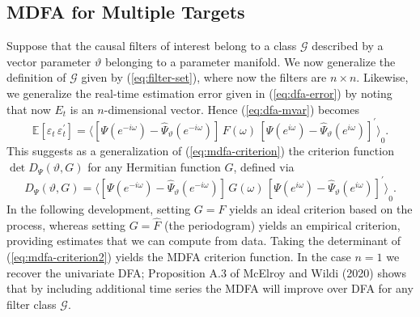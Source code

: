 \documentclass[a4paper]{book}
\def\EE{\mathbb E}
\begin{document}
 
\subsection{MDFA for Multiple Targets}

Suppose that the causal filters of interest belong to a class
  $\mathcal{G}$  described by a vector parameter $\vartheta$ belonging to a 
 parameter manifold.  We now generalize the definition of $\mathcal{G}$ given
  by (\ref{eq:filter-set}),  where now the filters are $n \times n$.
  Likewise, we generalize the real-time estimation error   given in (\ref{eq:dfa-error})
 by noting that now $E_t$ is an $n$-dimensional vector.  
  Hence (\ref{eq:dfa-mvar}) becomes
\begin{equation}
 \label{eq:dfa-mvar2}
   \EE [ \varepsilon_t \, \varepsilon_t^{\prime} ]  = 
   { \langle  \left[ \Psi ( e^{-i \omega} ) -  
   \widehat{\Psi}_{\vartheta} (e^{-i \omega}) \right] \,   F (\omega) \,
  {  \left[ \Psi (e^{i \omega}) -  \widehat{\Psi}_{\vartheta} (e^{i \omega}) \right] }^{\prime} \rangle }_0.
\end{equation}
   This suggests as a generalization of (\ref{eq:mdfa-criterion})
   the criterion function  $\det D_{\Psi} (\vartheta, G)$ for
 any Hermitian function $G$, defined via
\begin{equation}
\label{eq:mdfa-criterion2}
 D_{\Psi} (\vartheta, G) = { \langle  \left[ \Psi (e^{-i \omega}) - 
  \widehat{\Psi}_{\vartheta} (e^{-i \omega}) \right] \,   G (\omega) \,
  {  \left[ \Psi (e^{i \omega}) -  \widehat{\Psi}_{\vartheta} (e^{i \omega}) \right] }^{\prime} \rangle }_0.
\end{equation}
  In the following development, setting $G = F$ yields an ideal criterion based on the process,
 whereas setting $G =  \widehat{F}$ (the periodogram) yields an empirical criterion,
 providing estimates  that we can compute from data.  
 Taking the determinant of (\ref{eq:mdfa-criterion2}) yields
 the MDFA criterion function.   In the case $n=1$ we recover the univariate DFA; 
 Proposition A.3 of McElroy and Wildi (2020)  shows
that by including additional time series the MDFA will  improve over DFA for any filter class $\mathcal{G}$.
\end{document}
